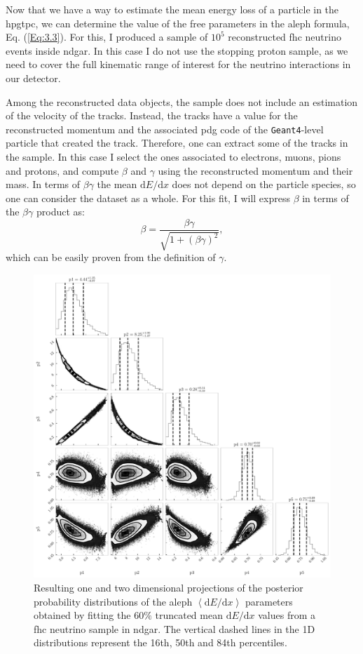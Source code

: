 Now that we have a way to estimate the mean energy loss of a particle in the \gls{hpgtpc}, we can determine the value of the free parameters in the \gls{aleph} formula, Eq. (\ref{Eq:3.3}). For this, I produced a sample of $10^{5}$ reconstructed \gls{fhc} neutrino events inside \gls{ndgar}. In this case I do not use the stopping proton sample, as we need to cover the full kinematic range of interest for the neutrino interactions in our detector.

Among the reconstructed data objects, the sample does not include an estimation of the velocity of the tracks. Instead, the tracks have a value for the reconstructed momentum and the associated \gls{pdg} code of the \texttt{Geant4}-level particle that created the track. Therefore, one can extract some of the tracks in the sample. In this case I select the ones associated to electrons, muons, pions and protons, and compute $\beta$ and $\gamma$ using the reconstructed momentum and their mass. In terms of $\beta\gamma$ the mean $\mathrm{d}E/\mathrm{d}x$ does not depend on the particle species, so one can consider the dataset as a whole. For this fit, I will express $\beta$ in terms of the $\beta\gamma$ product as:
\begin{equation}
    \beta = \frac{\beta\gamma}{\sqrt{1+(\beta\gamma)^{2}}},
\end{equation}
which can be easily proven from the definition of $\gamma$.

\begin{figure}[t]
	\centering
	\includegraphics[width=.85\linewidth]{Images/GArSoft_PID/dEdx/mcmc_weighted_equal_frequency_bin_200.pdf}
	\caption[Resulting one and two dimensional projections of the posterior probability distributions of the \gls{aleph} $\left<\mathrm{d}E/\mathrm{d}x\right>$ parameters.]{Resulting one and two dimensional projections of the posterior probability distributions of the \gls{aleph} $\left<\mathrm{d}E/\mathrm{d}x\right>$ parameters obtained by fitting the $60\%$ truncated mean $\mathrm{d}E/\mathrm{d}x$ values from a \gls{fhc} neutrino sample in \gls{ndgar}. The vertical dashed lines in the 1D distributions represent the 16th, 50th and 84th percentiles.}
	\label{fig:dEdx_aleph_fit}
\end{figure}

